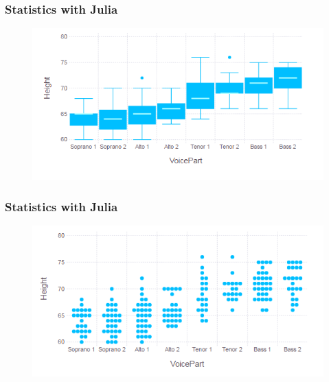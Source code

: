 \documentclass[Master.tex]{subfiles}
\begin{document}
	
\begin{frame}[fragile]
	\frametitle{Statistics with Julia}
	\large

	
	\begin{figure}
		\centering
\includegraphics[width=1.10\linewidth]{images/boxplot1}
	\end{figure}
\end{frame}
\begin{frame}[fragile]
	\frametitle{Statistics with Julia}
	\large

	\begin{figure}
		\centering
\includegraphics[width=1.10\linewidth]{images/beeswarm}

	\end{figure}
\end{frame}
\end{document}
